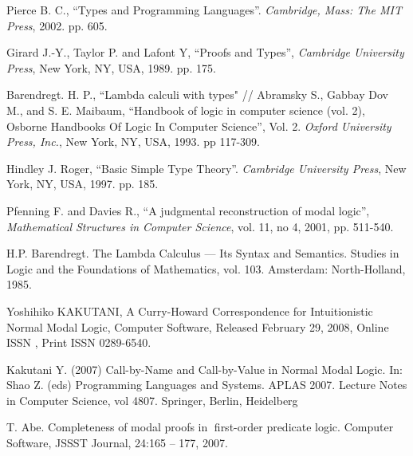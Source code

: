 \documentclass[a4paper]{article}
\begin{document}
\begin{thebibliography}{}
   Pierce B. C., ``Types and Programming Languages''. \textit{Cambridge, Mass: The MIT
  Press}, 2002. pp. 605. \parskip=1mm

   Girard J.-Y., Taylor P. and  Lafont Y, ``Proofs and Types'', \textit{Cambridge University
  Press}, New York, NY, USA, 1989. pp. 175. \parskip=1mm

   Barendregt. H. P., ``Lambda calculi with types" // Abramsky S., Gabbay Dov M., and S. E.
  Maibaum, ``Handbook of logic in computer science (vol. 2), Osborne Handbooks Of Logic In Computer
  Science'', Vol. 2. \textit{Oxford University Press, Inc.}, New York, NY, USA, 1993. pp 117-309.
  \parskip=1mm

   Hindley J. Roger, ``Basic Simple Type Theory''. \textit{Cambridge University Press}, New
  York, NY, USA, 1997. pp. 185. \parskip=1mm

   Pfenning F. and Davies R., ``A judgmental reconstruction of modal logic'',
  \textit{Mathematical Structures in Computer Science}, vol. 11, no 4, 2001, pp. 511-540. \parskip=1mm

   H.P. Barendregt. The Lambda Calculus --- Its Syntax and Semantics. Studies in Logic and
  the Foundations of Mathematics, vol. 103. Amsterdam: North-Holland, 1985.

   Yoshihiko KAKUTANI, A Curry-Howard Correspondence for Intuitionistic Normal Modal Logic, Computer Software, Released February 29, 2008, Online ISSN , Print ISSN 0289-6540.

   Kakutani Y. (2007) Call-by-Name and Call-by-Value in Normal Modal Logic. In: Shao Z. (eds) Programming Languages and Systems. APLAS 2007. Lecture Notes in Computer Science, vol 4807. Springer, Berlin, Heidelberg

   T. Abe. Completeness of modal proofs in first-order predicate logic. Computer Software, JSSST Journal, 24:165 -- 177, 2007.




\end{thebibliography}
\end{document}
